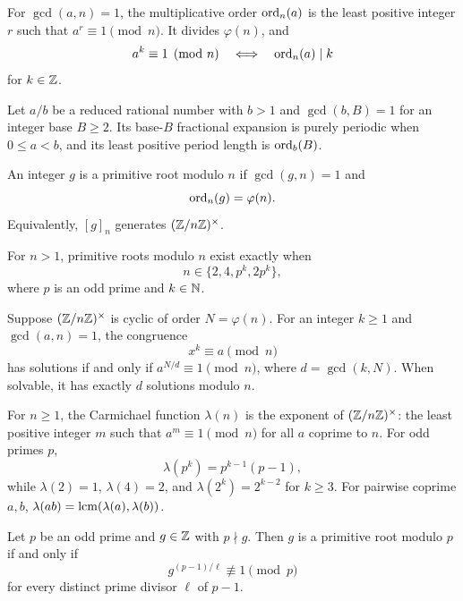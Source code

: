 \begin{definition}
For $\gcd(a, n)=1$, the multiplicative order $\operatorname{ord}_n(a)$ is the least positive integer $r$ such that $a^r\equiv1\pmod n$. It divides $\varphi(n)$, and
\[
 a^k\equiv1\pmod n
 \quad\Longleftrightarrow\quad\operatorname{ord}_n(a)\mid k
\]
for $k\in\mathbb{Z}$.
\end{definition}

\begin{proposition}
Let $a/b$ be a reduced rational number with $b>1$ and $\gcd(b,B)=1$ for an integer base $B\ge2$. Its base-$B$ fractional expansion is purely periodic when $0\le a<b$, and its least positive period length is $\operatorname{ord}_b(B)$.
\end{proposition}

\begin{definition}
An integer $g$ is a primitive root modulo $n$ if $\gcd(g, n)=1$ and
\[
 \operatorname{ord}_n(g)=\varphi(n).
\]
Equivalently, $[g]_n$ generates $(\mathbb{Z}/n\mathbb{Z})^\times$.
\end{definition}

\begin{theorem}
For $n>1$, primitive roots modulo $n$ exist exactly when
\[
 n\in\{2, 4, p^k, 2p^k\},
\]
where $p$ is an odd prime and $k\in\mathbb{N}$.
\end{theorem}

\begin{proposition}
Suppose $(\mathbb{Z}/n\mathbb{Z})^\times$ is cyclic of order $N=\varphi(n)$. For an integer $k\ge1$ and $\gcd(a, n)=1$, the congruence
\[
 x^k\equiv a\pmod n
\]
has solutions if and only if $a^{N/d}\equiv1\pmod n$, where $d=\gcd(k, N)$. When solvable, it has exactly $d$ solutions modulo $n$.
\end{proposition}

\begin{definition}
For $n\ge1$, the Carmichael function $\lambda(n)$ is the exponent of $(\mathbb{Z}/n\mathbb{Z})^\times$: the least positive integer $m$ such that $a^m\equiv1\pmod n$ for all $a$ coprime to $n$. For odd primes $p$,
\[
 \lambda(p^k)=p^{k-1}(p-1),
\]
while $\lambda(2)=1$, $\lambda(4)=2$, and $\lambda(2^k)=2^{k-2}$ for $k\ge3$. For pairwise coprime $a, b$, $\lambda(ab)=\operatorname{lcm}(\lambda(a), \lambda(b))$.
\end{definition}


\begin{theorem}
Let $p$ be an odd prime and $g\in\mathbb{Z}$ with $p\nmid g$. Then $g$ is a primitive root modulo $p$ if and only if
\[
 g^{(p-1)/\ell}\not\equiv1\pmod p
\]
for every distinct prime divisor $\ell$ of $p-1$.
\end{theorem}

